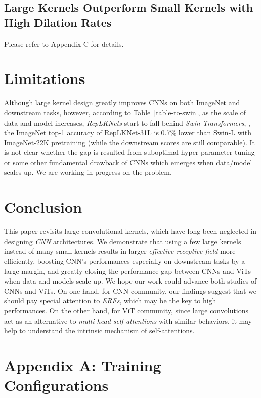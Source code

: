 \documentclass[10pt,twocolumn,letterpaper]{article}
\begin{document}
	
	\subsection{Large Kernels Outperform Small Kernels with High Dilation Rates} 
	
	Please refer to Appendix C for details.
	


	
	\section{Limitations}
	
	Although large kernel design greatly improves CNNs on both ImageNet and downstream tasks, however, according to Table~\ref{table-to-swin}, as the scale of data and model increases, \emph{RepLKNets} start to fall behind \emph{Swin Transformers}, \eg, the ImageNet top-1 accuracy of RepLKNet-31L is 0.7\% lower than Swin-L with ImageNet-22K pretraining (while the downstream scores are still comparable). It is not clear whether the gap is resulted from suboptimal hyper-parameter tuning or some other fundamental drawback of CNNs which emerges when data/model scales up. We are working in progress on the problem. 
	
	\section{Conclusion}
	
	This paper revisits large convolutional kernels, which have long been neglected in designing \emph{CNN} architectures. We demonstrate that using a few large kernels instead of many small kernels results in larger \emph{effective receptive field} more efficiently, boosting CNN's performances especially on downstream tasks by a large margin, and greatly closing the performance gap between CNNs and ViTs when data and models scale up. We hope our work could advance both studies of CNNs and ViTs. On one hand, for CNN community, our findings suggest that we should pay special attention to \emph{ERFs}, which may be the key to high performances. On the other hand, for ViT community, since large convolutions act as an alternative to \emph{multi-head self-attentions} with similar behaviors, it may help to understand the intrinsic mechanism of self-attentions.   
	
	
{\small
		
		
	}
	
	\newpage
	
	
	\section*{Appendix A: Training Configurations}
	
\end{document}
